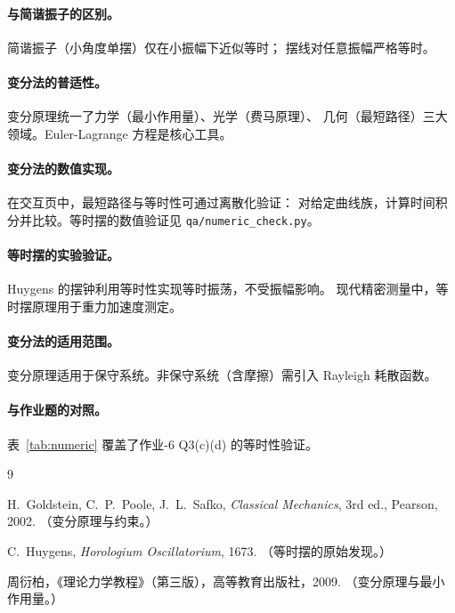 \documentclass[UTF8,a4paper,11pt]{ctexart}
\begin{document}
\paragraph{与简谐振子的区别。}
简谐振子（小角度单摆）仅在小振幅下近似等时；
摆线对任意振幅严格等时。

\paragraph{变分法的普适性。}
变分原理统一了力学（最小作用量）、光学（费马原理）、
几何（最短路径）三大领域。Euler-Lagrange 方程是核心工具。

\paragraph{变分法的数值实现。}
在交互页中，最短路径与等时性可通过离散化验证：
对给定曲线族，计算时间积分并比较。等时摆的数值验证见
\texttt{qa/numeric\_check.py}。

\paragraph{等时摆的实验验证。}
Huygens 的摆钟利用等时性实现等时振荡，不受振幅影响。
现代精密测量中，等时摆原理用于重力加速度测定。

\paragraph{变分法的适用范围。}
变分原理适用于保守系统。非保守系统（含摩擦）需引入 Rayleigh 耗散函数。

\paragraph{与作业题的对照。}
表~\ref{tab:numeric} 覆盖了作业-6 Q3(c)(d) 的等时性验证。

\begin{thebibliography}{9}

H.~Goldstein, C.~P.~Poole, J.~L.~Safko,
\emph{Classical Mechanics}, 3rd ed., Pearson, 2002.
（变分原理与约束。）

C.~Huygens, \emph{Horologium Oscillatorium}, 1673.
（等时摆的原始发现。）

周衍柏，《理论力学教程》（第三版），高等教育出版社，2009.
（变分原理与最小作用量。）

\end{thebibliography}
\end{document}
